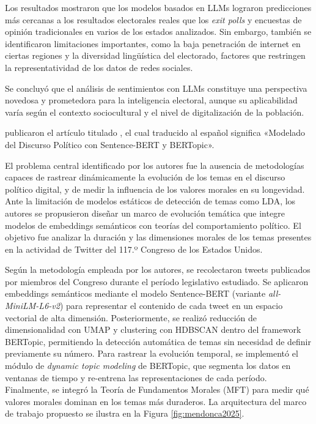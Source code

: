 \documentclass[listof=nochaptergap,12pt,times,authoryear]{report}
\let\cite\textcite
\begin{document}
Los resultados mostraron que los modelos basados en LLMs lograron predicciones más cercanas a los resultados electorales reales que los \textit{exit polls} y encuestas de opinión tradicionales en varios de los estados analizados. Sin embargo, también se identificaron limitaciones importantes, como la baja penetración de internet en ciertas regiones y la diversidad lingüística del electorado, factores que restringen la representatividad de los datos de redes sociales.
 
Se concluyó que el análisis de sentimientos con LLMs constituye una perspectiva novedosa y prometedora para la inteligencia electoral, aunque su aplicabilidad varía según el contexto sociocultural y el nivel de digitalización de la población.
 
\cite{pr_mendonca2025bertopic_political} publicaron el artículo titulado , el cual traducido al español significa «Modelado del Discurso Político con Sentence-BERT y BERTopic».
 
El problema central identificado por los autores fue la ausencia de metodologías capaces de rastrear dinámicamente la evolución de los temas en el discurso político digital, y de medir la influencia de los valores morales en su longevidad. Ante la limitación de modelos estáticos de detección de temas como LDA, los autores se propusieron diseñar un marco de evolución temática que integre modelos de embeddings semánticos con teorías del comportamiento político. El objetivo fue analizar la duración y las dimensiones morales de los temas presentes en la actividad de Twitter del 117.º Congreso de los Estados Unidos.
 
Según la metodología empleada por los autores, se recolectaron tweets publicados por miembros del Congreso durante el período legislativo estudiado. Se aplicaron embeddings semánticos mediante el modelo Sentence-BERT (variante \textit{all-MiniLM-L6-v2}) para representar el contenido de cada tweet en un espacio vectorial de alta dimensión. Posteriormente, se realizó reducción de dimensionalidad con UMAP y clustering con HDBSCAN dentro del framework BERTopic, permitiendo la detección automática de temas sin necesidad de definir previamente su número. Para rastrear la evolución temporal, se implementó el módulo de \textit{dynamic topic modeling} de BERTopic, que segmenta los datos en ventanas de tiempo y re-entrena las representaciones de cada período. Finalmente, se integró la Teoría de Fundamentos Morales (MFT) para medir qué valores morales dominan en los temas más duraderos. La arquitectura del marco de trabajo propuesto se ilustra en la Figura \ref{fig:mendonca2025}.
 
\end{document}
